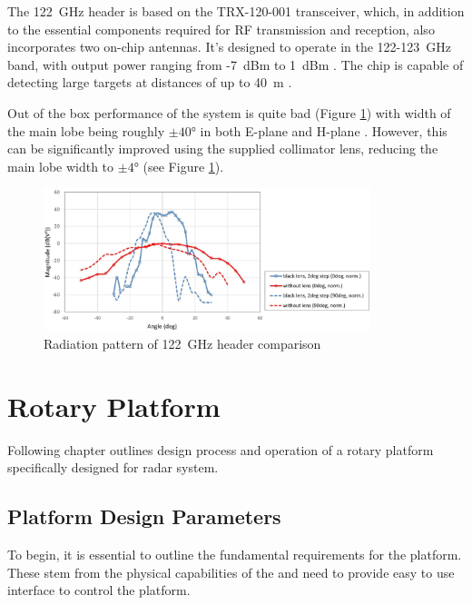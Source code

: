 The 122~GHz header is based on the TRX-120-001 transceiver, which, in addition to the essential components required for RF transmission and reception, also incorporates two on-chip antennas.
It's designed to operate in the 122-123~GHz band, with output power ranging from -7~dBm to 1~dBm \cite{sidarTRX122}.
The chip is capable of detecting large targets at distances of up to 40~m \cite{sidarMANOld}.

Out of the box performance of the system is quite bad (Figure \ref{fig:sidar122rad}) with width of the main lobe being roughly $\pm40\text{°}$ in both E-plane and H-plane \cite{sidarTRX122}.
However, this can be significantly improved using the supplied collimator lens, reducing the main lobe width to $\pm4\text{°}$ \cite{sidarTRX122col} (see Figure \ref{fig:sidar122rad}).


\begin{figure}[h!]
	\centering
	\includegraphics[width=0.85\textwidth]{../img/sidar122rad.jpg}
	\caption[Radiation pattern of 122~GHz header comparison \cite{sidarTRX122col}]{Radiation pattern of 122~GHz header comparison}
	\label{fig:sidar122rad}
\end{figure}



\chapter{Rotary Platform}

Following chapter outlines design process and operation of a rotary platform specifically designed for \sidar radar system.

\section{Platform Design Parameters}


To begin, it is essential to outline the fundamental requirements for the platform.
These stem from the physical capabilities of the \sidar and need to provide easy to use interface to control the platform.

